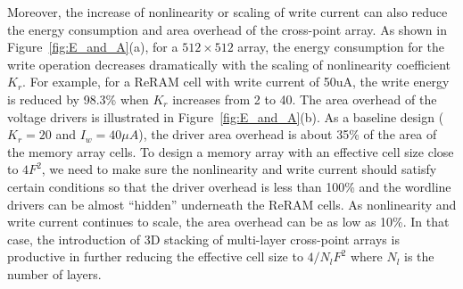 Moreover, the increase of nonlinearity or scaling of write current can
also reduce the energy consumption and area overhead of the cross-point
array. As shown in Figure~\ref{fig:E_and_A}(a), for a $512 \times 512$
array, the energy consumption for the write operation decreases
dramatically with the scaling of nonlinearity coefficient $K_r$. For
example, for a ReRAM cell with write current of 50uA, the write energy is
reduced by 98.3\% when $K_r$ increases from 2 to 40. The area overhead of
the voltage drivers is illustrated in Figure~\ref{fig:E_and_A}(b). As a
baseline design ($K_r=20$ and $I_w=40\mu A$), the driver area overhead is
about 35\% of the area of the memory array cells. To design a memory array
with an effective cell size close to $4F^2$, we need to make sure the
nonlinearity and write current should satisfy certain conditions so that
the driver overhead is less than 100\% and the wordline drivers can be
almost ``hidden'' underneath the ReRAM cells. As nonlinearity and write
current continues to scale, the area overhead can be as low as 10\%. In
that case, the introduction of 3D stacking of multi-layer cross-point
arrays is productive in further reducing the effective cell size to $4/N_l
F^2$ where $N_l$ is the number of layers.



